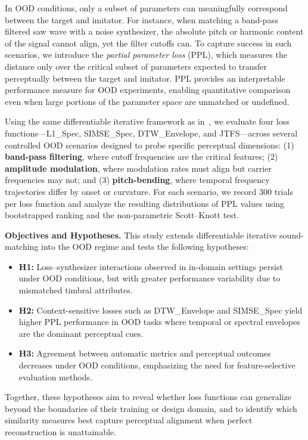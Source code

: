 \documentclass[14pt]{extarticle} %
\begin{document}
In OOD conditions, only a subset of parameters can meaningfully correspond between the target and imitator.  
For instance, when matching a band-pass filtered saw wave with a noise synthesizer, the absolute pitch or harmonic content of the signal cannot align, yet the filter cutoffs can.  
To capture success in such scenarios, we introduce the \emph{partial parameter loss} (PPL), which measures the distance only over the critical subset of parameters expected to transfer perceptually between the target and imitator.  
PPL provides an interpretable performance measure for OOD experiments, enabling quantitative comparison even when large portions of the parameter space are unmatched or undefined.

Using the same differentiable iterative framework as in~\cite{salimi2025soundmatching}, we evaluate four loss functions—L1\_Spec, SIMSE\_Spec, DTW\_Envelope, and JTFS—across several controlled OOD scenarios designed to probe specific perceptual dimensions: (1) \textbf{band-pass filtering}, where cutoff frequencies are the critical features; (2) \textbf{amplitude modulation}, where modulation rates must align but carrier frequencies may not; and (3) \textbf{pitch-bending}, where temporal frequency trajectories differ by onset or curvature.  
For each scenario, we record 300 trials per loss function and analyze the resulting distributions of PPL values using bootstrapped ranking and the non-parametric Scott–Knott test.

\textbf{Objectives and Hypotheses.}  
This study extends differentiable iterative sound-matching into the OOD regime and tests the following hypotheses:
\begin{itemize}
  \item \textbf{H1:} Loss–synthesizer interactions observed in in-domain settings persist under OOD conditions, but with greater performance variability due to mismatched timbral attributes.
  \item \textbf{H2:} Context-sensitive losses such as DTW\_Envelope and SIMSE\_Spec yield higher PPL performance in OOD tasks where temporal or spectral envelopes are the dominant perceptual cues.
  \item \textbf{H3:} Agreement between automatic metrics and perceptual outcomes decreases under OOD conditions, emphasizing the need for feature-selective evaluation methods.
\end{itemize}
Together, these hypotheses aim to reveal whether loss functions can generalize beyond the boundaries of their training or design domain, and to identify which similarity measures best capture perceptual alignment when perfect reconstruction is unattainable.
\end{document}
